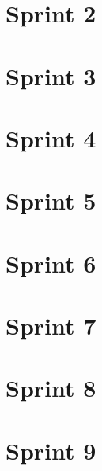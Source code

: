 \documentclass[twoside]{report}
\begin{document}
\section{Sprint 2}



\newpage

\section{Sprint 3}



\newpage

\section{Sprint 4}



\newpage

\section{Sprint 5}



\newpage

\section{Sprint 6}



\newpage

\section{Sprint 7}



\newpage

\section{Sprint 8}



\newpage

\section{Sprint 9}



\newpage
\end{document}
